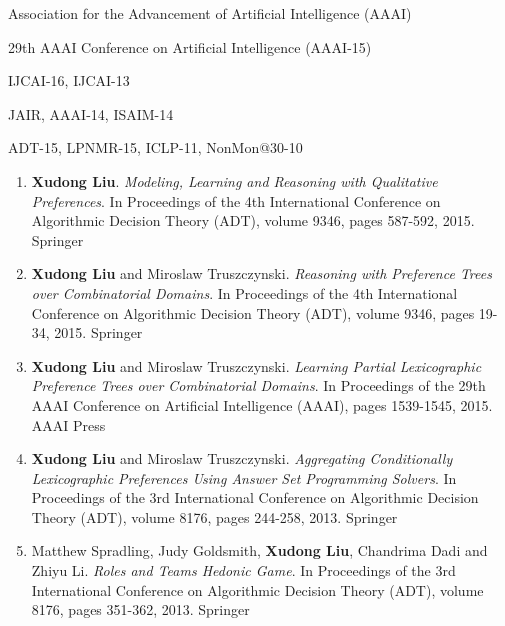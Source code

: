 	\begin{description} \itemsep -3pt
		\item[Student member:] {Association for the Advancement of Artificial Intelligence (AAAI)}
		\item[Student volunteer:] {29th AAAI Conference on Artificial Intelligence (AAAI-15)}
		\item[Program committee:] {IJCAI-16, IJCAI-13}
		\item[Paper reviewer:] {JAIR, AAAI-14, ISAIM-14}
		\item[Local arrangement committee:] {ADT-15, LPNMR-15, ICLP-11, NonMon@30-10}
	\end{description} %
\vspace{3pt}



{}{} \vspace{-0.4cm}
\begin{enumerate}  \itemsep -3pt
	\item \textbf{Xudong Liu}.
		\textit{Modeling, Learning and Reasoning with Qualitative Preferences}.
		In Proceedings of the 4th International Conference on Algorithmic Decision Theory (ADT),
		volume 9346, pages 587-592, 2015. Springer
	\item \textbf{Xudong Liu} and Miroslaw Truszczynski.
		\textit{Reasoning with Preference Trees over Combinatorial Domains}.
		In Proceedings of the 4th International Conference on Algorithmic Decision Theory (ADT),
		volume 9346, pages 19-34, 2015. Springer
	\item \textbf{Xudong Liu} and Miroslaw Truszczynski.
		\textit{Learning Partial Lexicographic Preference Trees over Combinatorial Domains}.
		In Proceedings of the 29th AAAI Conference on Artificial Intelligence (AAAI),
		pages 1539-1545, 2015. AAAI Press
	\item \textbf{Xudong Liu} and Miroslaw Truszczynski.
		\textit{Aggregating Conditionally Lexicographic Preferences Using Answer Set Programming Solvers}.
		In Proceedings of the 3rd International Conference on Algorithmic Decision Theory (ADT),
		volume 8176, pages 244-258, 2013. Springer
	\item Matthew Spradling, Judy Goldsmith, {\bf Xudong Liu}, Chandrima Dadi and Zhiyu Li.
		\textit{Roles and Teams Hedonic Game}.
		In Proceedings of the 3rd International Conference on Algorithmic Decision Theory (ADT), 
		volume 8176, pages 351-362, 2013. Springer
\end{enumerate}

